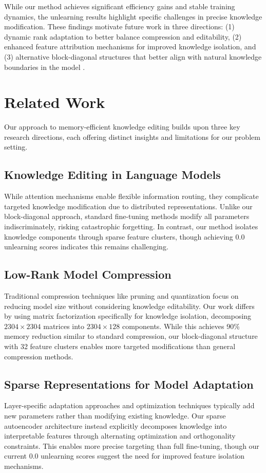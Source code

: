 \documentclass{article} %
\begin{document}
While our method achieves significant efficiency gains and stable training dynamics, the unlearning results highlight specific challenges in precise knowledge modification. These findings motivate future work in three directions: (1) dynamic rank adaptation to better balance compression and editability, (2) enhanced feature attribution mechanisms for improved knowledge isolation, and (3) alternative block-diagonal structures that better align with natural knowledge boundaries in the model \cite{radford2019language}.

\section{Related Work}
\label{sec:related}

Our approach to memory-efficient knowledge editing builds upon three key research directions, each offering distinct insights and limitations for our problem setting.

\subsection{Knowledge Editing in Language Models}
While attention mechanisms \cite{vaswani2017attention} enable flexible information routing, they complicate targeted knowledge modification due to distributed representations. Unlike our block-diagonal approach, standard fine-tuning methods \cite{radford2019language} modify all parameters indiscriminately, risking catastrophic forgetting. In contrast, our method isolates knowledge components through sparse feature clusters, though achieving 0.0 unlearning scores indicates this remains challenging.

\subsection{Low-Rank Model Compression}
Traditional compression techniques like pruning and quantization \cite{goodfellow2016deep} focus on reducing model size without considering knowledge editability. Our work differs by using matrix factorization specifically for knowledge isolation, decomposing $2304 \times 2304$ matrices into $2304 \times 128$ components. While this achieves 90\% memory reduction similar to standard compression, our block-diagonal structure with 32 feature clusters enables more targeted modifications than general compression methods.

\subsection{Sparse Representations for Model Adaptation}
Layer-specific adaptation approaches \cite{ba2016layer} and optimization techniques \cite{kingma2014adam} typically add new parameters rather than modifying existing knowledge. Our sparse autoencoder architecture instead explicitly decomposes knowledge into interpretable features through alternating optimization and orthogonality constraints. This enables more precise targeting than full fine-tuning, though our current 0.0 unlearning scores suggest the need for improved feature isolation mechanisms.
\end{document}
